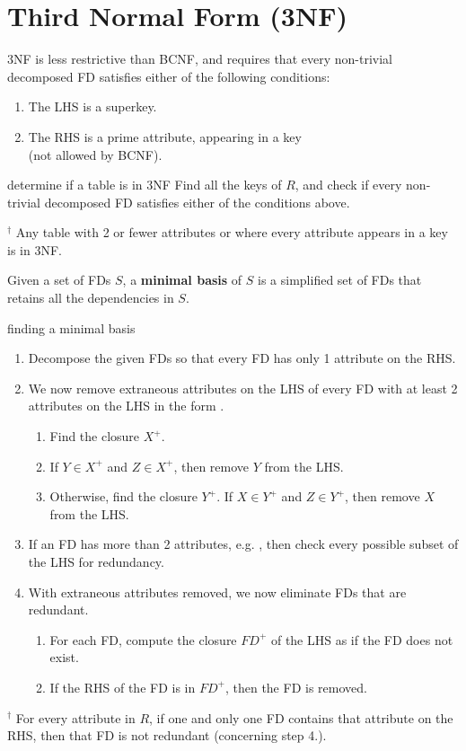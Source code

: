 \section{Third Normal Form (3NF)}
3NF is less restrictive than BCNF, and requires that every non-trivial decomposed FD satisfies either of the following conditions:

\begin{enumerate}
    \item The LHS is a superkey.
    \item The RHS is a prime attribute, appearing in a key \\ (not allowed by BCNF).
\end{enumerate}

\begin{defn}{determine if a table is in 3NF}
    Find all the keys of $R$, and check if every non-trivial decomposed FD satisfies either of the conditions above.

    $^\dagger$ Any table with 2 or fewer attributes or where every attribute appears in a key is in 3NF.
\end{defn}

Given a set of FDs $S$, a \textbf{minimal basis} of $S$ is a simplified set of FDs that retains all the dependencies in $S$.

\begin{defn*}{finding a minimal basis}
    \begin{enumerate}
        \item Decompose the given FDs so that every FD has only 1 attribute on the RHS.
        \item We now remove extraneous attributes on the LHS of every FD with at least 2 attributes on the LHS in the form .
        \begin{enumerate}
            \item Find the closure $X^+$.
            \item If $Y \in X^+$ and $Z \in X^+$, then remove $Y$ from the LHS.
            \item Otherwise, find the closure $Y^+$. If $X \in Y^+$ and $Z \in Y^+$, then remove $X$ from the LHS.
        \end{enumerate}
        \item If an FD has more than 2 attributes, e.g. , then check every possible subset of the LHS for redundancy.
        \item With extraneous attributes removed, we now eliminate FDs that are redundant.
        \begin{enumerate}
            \item For each FD, compute the closure $FD^+$ of the LHS as if the FD does not exist.
            \item If the RHS of the FD is in $FD^+$, then the FD is removed.
        \end{enumerate}
    \end{enumerate}
    $^\dagger$ For every attribute in $R$, if one and only one FD contains that attribute on the RHS, then that FD is not redundant (concerning step 4.).
\end{defn*}

